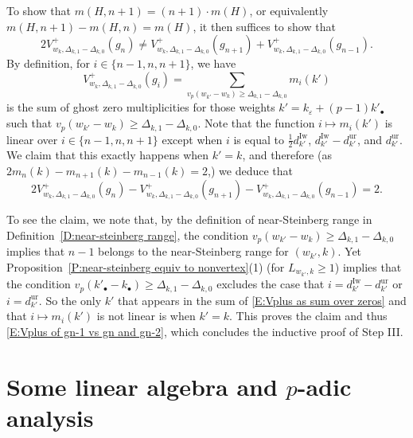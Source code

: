 \documentclass[12pt]{amsart}
\theoremstyle{definition}
\numberwithin{equation}{subsection}
\newcommand{\Iw}{\mathrm{Iw}}
\newcommand{\ur}{\mathrm{ur}}
\begin{document}
To show that $m(H,n+1) = (n+1)\cdot m(H)$, or equivalently $m(H,n+1)-m(H,n) =m(H)$, it then suffices to show that
\begin{equation}
\label{E:Vplus of gn-1 vs gn and gn-2}
2V_{w_k, \Delta_{k,1}-\Delta_{k,0}}^+(g_{n}) \neq V_{w_k, \Delta_{k,1}-\Delta_{k,0}}^+(g_{n+1})+V_{w_k, \Delta_{k,1}-\Delta_{k,0}}^+(g_{n-1}).
\end{equation}
By definition, for $i \in \{n-1,n,n+1\}$, we have
\begin{equation}
\label{E:Vplus as sum over zeros}
V_{w_k, \Delta_{k,1}-\Delta_{k,0}}^+(g_i) = \sum_{v_p(w_{k'}-w_k) \geq \Delta_{k,1}-\Delta_{k,0}} m_i(k')
\end{equation}
is the sum of ghost zero multiplicities for those weights $k'= k_\varepsilon +(p-1)k'_\bullet$ such that $v_p(w_{k'}-w_k) \geq \Delta_{k,1}-\Delta_{k,0}$.
Note that the function $i \mapsto m_i(k')$ is linear over $i \in \{n-1,n,n+1\}$ except when $i$ is equal to $\frac 12d_{k'}^\Iw$, $d_{k'}^\Iw-d_{k'}^\ur$, and $d_{k'}^\ur$.
We claim that this exactly happens when $k' = k$, and therefore (as $2m_n(k)-m_{n+1}(k)-m_{n-1}(k) = 2$,) we deduce that 
$$2V_{w_k, \Delta_{k,1}-\Delta_{k,0}}^+(g_{n}) - V_{w_k, \Delta_{k,1}-\Delta_{k,0}}^+(g_{n+1})-V_{w_k, \Delta_{k,1}-\Delta_{k,0}}^+(g_{n-1}) = 2.
$$


To see the claim, we note that, by the definition of near-Steinberg range in Definition~\ref{D:near-steinberg range}, the condition $v_p(w_{k'}-w_k) \geq \Delta_{k,1}-\Delta_{k,0}$ implies that $n-1$ belongs to the near-Steinberg range for $(w_{k'}, k)$.  Yet Proposition~\ref{P:near-steinberg equiv to nonvertex}(1) (for $L_{w_{k'},k} \geq 1$) implies that the condition $v_p(k'_\bullet-k_\bullet) \geq \Delta_{k,1}-\Delta_{k,0}$ excludes the case that $i=d_{k'}^\Iw-d_{k'}^\ur$ or $i=d_{k'}^\ur$. So the only $k'$ that appears in the sum of \eqref{E:Vplus as sum over zeros} and that $i\mapsto m_i(k')$ is not linear is when $k' = k$.
This proves the claim and thus 
\eqref{E:Vplus of gn-1 vs gn and gn-2}, which concludes the inductive proof of Step III.

\appendix

\section{Some linear algebra and $p$-adic analysis}
\end{document}
